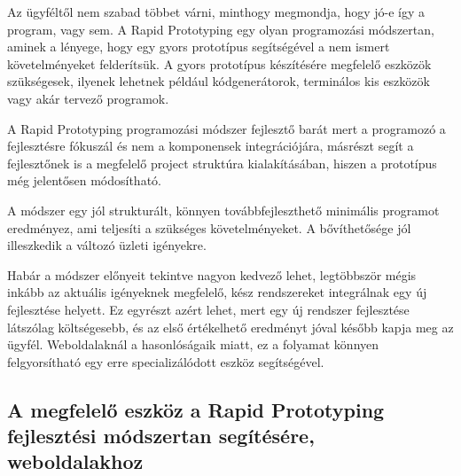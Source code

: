 \documentclass[a4paper,12pt,oneside]{report}
\begin{document}
\begin{justify}

	Az ügyféltől nem szabad többet várni, minthogy megmondja, hogy jó-e így a program, vagy sem. A Rapid Prototyping egy olyan programozási módszertan, aminek a lényege, hogy egy gyors prototípus segítségével a nem ismert követelményeket felderítsük. A gyors prototípus készítésére megfelelő eszközök szükségesek, ilyenek lehetnek például kódgenerátorok, terminálos kis eszközök vagy akár tervező programok. \cite{website:rapid_prototype}

	A Rapid Prototyping programozási módszer fejlesztő barát mert a programozó a fejlesztésre fókuszál és nem a komponensek integrációjára, másrészt segít a fejlesztőnek is a megfelelő project struktúra kialakításában, hiszen a prototípus még jelentősen módosítható.

	A módszer egy jól strukturált, könnyen továbbfejleszthető minimális programot eredményez, ami teljesíti a szükséges követelményeket. A bővíthetősége jól illeszkedik a változó üzleti igényekre. 

	Habár a módszer előnyeit tekintve nagyon kedvező lehet, legtöbbször mégis inkább az aktuális igényeknek megfelelő, kész rendszereket integrálnak egy új fejlesztése helyett. Ez egyrészt azért lehet, mert egy új rendszer fejlesztése látszólag költségesebb, és az első értékelhető eredményt jóval később kapja meg az ügyfél. Weboldalaknál a hasonlóságaik miatt, ez a folyamat könnyen felgyorsítható egy erre specializálódott eszköz segítségével.

\end{justify}

\newpage
\subsection{A megfelelő eszköz a Rapid Prototyping fejlesztési módszertan segítésére, weboldalakhoz }
\end{document}
